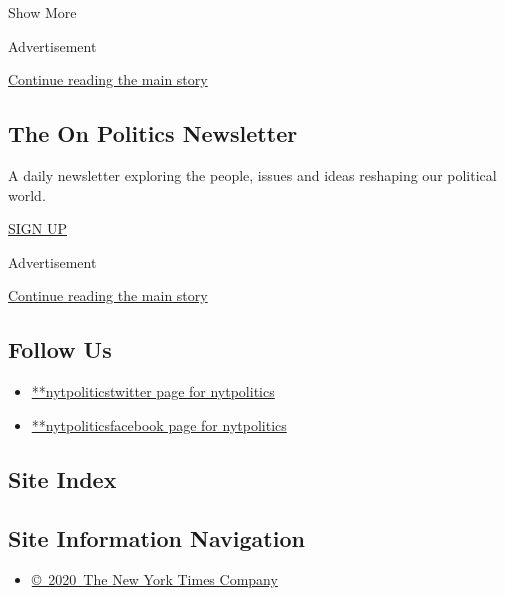 Show More

Advertisement

\protect\hyperlink{after-mid2}{Continue reading the main story}

\hypertarget{the-on-politics-newsletter}{%
\subsection{The On Politics
Newsletter}\label{the-on-politics-newsletter}}

A daily newsletter exploring the people, issues and ideas reshaping our
political world.

\href{/newsletters/signup/CN}{SIGN UP}

Advertisement

\protect\hyperlink{after-mktg}{Continue reading the main story}

\hypertarget{follow-us}{%
\subsection{Follow Us}\label{follow-us}}

\begin{itemize}
\tightlist
\item
  \href{https://twitter.com/nytpolitics}{**nytpoliticstwitter page for
  nytpolitics}
\item
  \href{https://www.facebook.com/nytpolitics}{**nytpoliticsfacebook page
  for nytpolitics}
\end{itemize}

\hypertarget{site-index}{%
\subsection{Site Index}\label{site-index}}

\hypertarget{site-information-navigation}{%
\subsection{Site Information
Navigation}\label{site-information-navigation}}

\begin{itemize}
\tightlist
\item
  \href{https://help.nytimes.com/hc/en-us/articles/115014792127-Copyright-notice}{©~2020~The
  New York Times Company}
\end{itemize}

